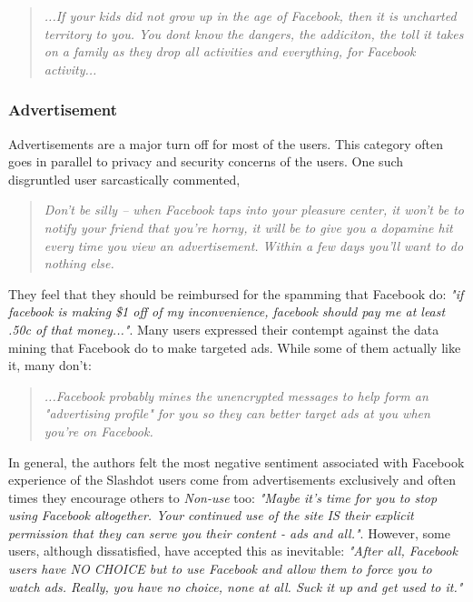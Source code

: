     \begin{quote}
         \textit{...If your kids did not grow up in the age of Facebook, then it is uncharted territory to you. You dont know the dangers, the addiciton, the toll it takes on a family as they drop all activities and everything, for Facebook activity...}
         
\end{quote}
    
 \subsubsection{Advertisement}
 Advertisements are a major turn off for most of the users. This category often goes in parallel to privacy and security concerns of the users. One such disgruntled user sarcastically commented, 
     \begin{quote}
         \textit{Don't be silly -- when Facebook taps into your pleasure center, it won't be to notify your friend that you're horny, it will be to give you a dopamine hit every time you view an advertisement. Within a few days you'll want to do nothing else. }
     \end{quote}
     
     They feel that they should be reimbursed for the spamming that Facebook do: \textit{"if facebook is making \$1 off of my inconvenience, facebook should pay me at least .50c of that money..."}. Many users expressed their contempt against the data mining that Facebook do to make targeted ads. While some of them actually like it, many don't:
     \begin{quote}
         \textit{...Facebook probably mines the unencrypted messages to help form an "advertising profile" for you so they can better target ads at you when you're on Facebook.}
    \end{quote}
    
    In general, the authors felt the most negative sentiment associated with Facebook experience of the Slashdot users come from advertisements exclusively and often times they encourage others to \emph{Non-use} too: \textit{"Maybe it's time for you to stop using Facebook altogether. Your continued use of the site IS their explicit permission that they can serve you their content - ads and all."}. However, some users, although dissatisfied, have accepted this as inevitable: \textit{"After all, Facebook users have NO CHOICE but to use Facebook and allow them to force you to watch ads. Really, you have no choice, none at all. Suck it up and get used to it."}
    
